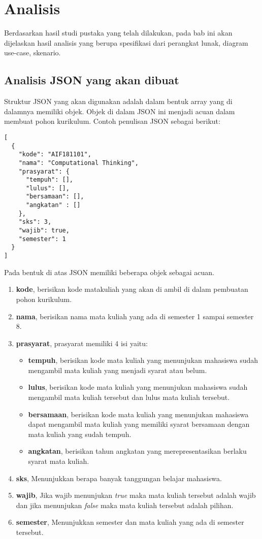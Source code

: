 \chapter{Analisis}
\label{chap: Analsisis}

Berdasarkan hasil studi pustaka yang telah dilakukan, pada bab ini akan dijelaskan hasil analisis
yang berupa spesifikasi dari perangkat lunak, diagram use-case, skenario.

\section{Analisis JSON yang akan dibuat}
\label{sec: Analisis JSON yang akan dibuat}

Struktur JSON yang akan digunakan adalah dalam bentuk array yang di dalamnya memiliki objek.  
Objek di dalam JSON ini menjadi acuan dalam membuat pohon kurikulum. Contoh penulisan JSON sebagai berikut:

\begin{lstlisting}
[
  {
    "kode": "AIF181101",
    "nama": "Computational Thinking",
    "prasyarat": {
      "tempuh": [],
      "lulus": [],
      "bersamaan": [],
      "angkatan" : []
    },
    "sks": 3,
    "wajib": true,
    "semester": 1
  }
]
\end{lstlisting}

Pada bentuk di atas JSON memiliki beberapa objek sebagai acuan.
\begin{enumerate}
\item \textbf{kode}, berisikan kode matakuliah yang akan di ambil di dalam pembuatan pohon kurikulum.
\item \textbf{nama}, berisikan nama mata kuliah yang ada di semester 1 sampai semester 8.
\item \textbf{prasyarat}, prasyarat memiliki 4 isi yaitu:
\begin{itemize}
\item \textbf{tempuh}, berisikan kode mata kuliah yang menunjukan mahasiswa sudah mengambil mata kuliah yang menjadi syarat atau belum. 
\item \textbf{lulus}, berisikan kode mata kuliah yang menunjukan mahasiswa sudah mengambil mata kuliah tersebut dan lulus mata kuliah tersebut.
\item \textbf{bersamaan}, berisikan kode mata kuliah yang menunjukan mahasiswa dapat mengambil mata kuliah yang memiliki syarat bersamaan dengan mata kuliah yang sudah tempuh.
\item \textbf{angkatan}, berisikan tahun angkatan yang merepresentasikan berlaku syarat mata kuliah.
\end{itemize}
\item \textbf{sks}, Menunjukkan berapa banyak tanggungan belajar mahasiswa.
\item \textbf{wajib}, Jika wajib menunjukan \textit{true} maka mata kuliah tersebut adalah wajib dan jika menunjukan \textit{false} maka mata kuliah tersebut adalah pilihan. 
\item \textbf{semester}, Menunjukkan semester dan mata kuliah yang ada di semester tersebut.
\end{enumerate}



